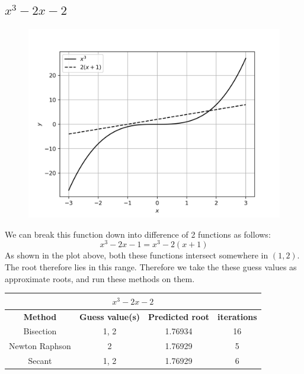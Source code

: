 \documentclass[12,a4paper]{article}
\begin{document}
    \subsection{$x^3 - 2x - 2$}
    \begin{figure}[H]
        \centering
        \includegraphics[width = \textwidth]{plots/p7.png}
        \label{fig:my_label}
    \end{figure}
    We can break this function down into difference of 2 functions as follows:
    \begin{equation}
        x^3-2x-1 = x^3 - 2(x+1)
    \end{equation}
    As shown in the plot above, both these functions intersect somewhere in $(1,2)$. The root therefore lies in this range. Therefore we take the these guess values as approximate roots, and run these methods on them.
    \begin{table}[h!]
        \centering
        \begin{tabular}{|c|c c c|} 
            \hline
            \multicolumn{4}{|c|}{$x^3 - 2x - 2$}\\
            \hline
            \textbf{Method}&\textbf{Guess value(s)}&\textbf{Predicted root}&\textbf{iterations} \\ [0.5ex] 
            \hline
            Bisection & 1, 2 & 1.76934 & 16 \\ 
            Newton Raphson & 2 & 1.76929 & 5 \\
            Secant &  1, 2 & 1.76929 & 6 \\[1ex] 
            \hline
        \end{tabular}
    \end{table}
\end{document}
